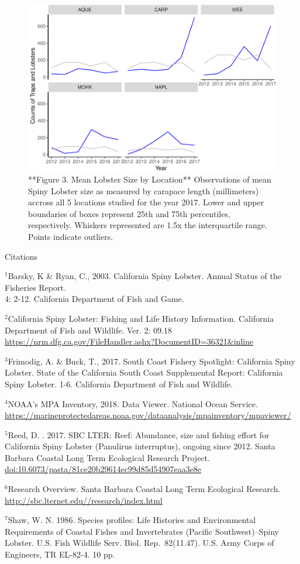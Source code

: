 \documentclass[]{article}
\begin{document}
\begin{figure}

{\centering \includegraphics{ESM206_Assignment4_files/figure-latex/unnamed-chunk-4-1} 

}

\caption{**Figure 3. Mean Lobster Size by Location** Observations of mean Spiny Lobster size as measured by carapace length (millimeters) accross all 5 locations studied for the year 2017. Lower and upper boundaries of boxes represent 25th and 75th percentiles, respectively. Whiskers represented are 1.5x the interquartile range. Points indicate outliers. }\label{fig:unnamed-chunk-4}
\end{figure}

Citations

\(^1\)Barsky, K \& Ryan, C., 2003. California Spiny Lobster. Annual
Status of the Fisheries Report.\\
4: 2-12. California Department of Fish and Game.

\(^2\)California Spiny Lobster: Fishing and Life History Information.
California Department of Fish and Wildlife. Ver. 2: 09.18
\url{https://nrm.dfg.ca.gov/FileHandler.ashx?DocumentID=36321\&inline}

\(^3\)Frimodig, A. \& Buck, T., 2017. South Coast Fishery Spotlight:
California Spiny Lobster. State of the California South Coast
Supplemental Report: California Spiny Lobster. 1-6. California
Department of Fish and Wildlife.

\(^4\)NOAA's MPA Inventory, 2018. Data Viewer. National Ocean Service.
\url{https://marineprotectedareas.noaa.gov/dataanalysis/mpainventory/mpaviewer/}

\(^5\)Reed, D. . 2017. SBC LTER: Reef: Abundance, size and fishing
effort for California Spiny Lobster (Panulirus interruptus), ongoing
since 2012. Santa Barbara Coastal Long Term Ecological Research Project.
\url{doi:10.6073/pasta/81ce20b29614ec99d85d54907eaa3e8e}

\(^6\)Research Overview. Santa Barbara Coastal Long Term Ecological
Research. \url{http://sbc.lternet.edu//research/index.html}

\(^7\)Shaw, W. N. 1986. Species profiles: Life Histories and
Environmental Requirements of Coastal Fishes and Invertebrates (Pacific
Southwest)--Spiny Lobster. U.S. Fish Wildlife Serv. Biol.
Rep.~82(11.47). U.S. Army Corps of Engineers, TR EL-82-4. 10 pp.
\end{document}
